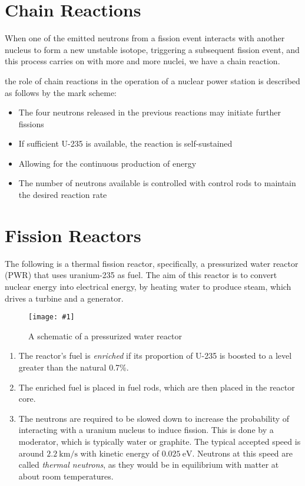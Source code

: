 \documentclass[a4paper,12pt]{article}
\let\oldsection\section
\renewcommand\section{\clearpage\oldsection}
\newcommand{\img}[4]{\begin{center}
  \begin{figure}[H]
    \centering
    \texttt{[image: \#1]}
    \caption{#3}
    \label{fig:#4}
  \end{figure}
\end{center}}
\begin{document}
\section{Chain Reactions}

When one of the emitted neutrons from a fission event interacts with another nucleus to form a new unstable isotope, triggering a subsequent fission event, and this process carries on with more and more nuclei, we have a chain reaction.

the role of chain reactions in the operation of a nuclear power station is described as follows by the mark scheme:
\begin{itemize}
  \item The four neutrons released in the previous reactions may initiate further fissions
  \item If sufficient U-235 is available, the reaction is self-sustained
  \item Allowing for the continuous production of energy
  \item The number of neutrons available is controlled with control rods to maintain the desired reaction rate
\end{itemize}

\section{Fission Reactors}

The following is a thermal fission reactor, specifically, a pressurized water reactor (PWR) that uses uranium-235 as fuel. The aim of this reactor is to convert nuclear energy into electrical energy, by heating water to produce steam, which drives a turbine and a generator.

\img{reactor.png}{1}{A schematic of a pressurized water reactor}{reactor}

\begin{enumerate}
  \item The reactor's fuel is \textit{enriched} if its proportion of U-235 is boosted to a level greater than the natural 0.7\%.

  \item The enriched fuel is placed in fuel rods, which are then placed in the reactor core.

  \item The neutrons are required to be slowed down to increase the probability of interacting with a uranium nucleus to induce fission. This is done by a moderator, which is typically water or graphite. The typical accepted speed is around $\SI{2.2}{\km\per\s}$ with kinetic energy of $\SI{0.025}{\eV}$. Neutrons at this speed are called \textit{thermal neutrons}, as they would be in equilibrium with matter at about room temperatures.
\end{enumerate}
\end{document}
